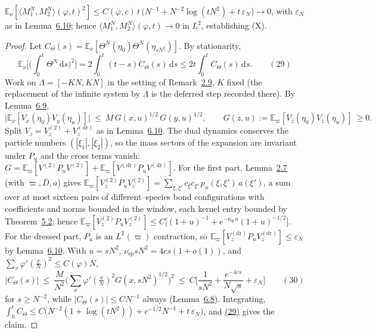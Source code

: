 \documentclass[11pt]{article}
\theoremstyle{plain}
\theoremstyle{definition}
\theoremstyle{remark}
\newcommand{\E}{\mathbb{E}}\newcommand{\PP}{\mathbb{P}}\newcommand{\dd}{\,\mathrm{d}}
\newcommand{\eps}{\varepsilon}\newcommand{\Exp}{\mathrm{Exp}}
\begin{document}
$\E_\nu[\langle M_1^N,M_2^N\rangle(\varphi,t)^2]\le
C(\varphi,c)\,t\,\big(N^{-1}+N^{-2}\log(tN^2)+t\,\eps_N\big)\to0$, with $\eps_N$ as
in Lemma~\hyperref[lem_eps]{6.10}; hence $\langle M_1^N,M_2^N\rangle(\varphi,t)\to0$ in $L^2$,
establishing \textup{(X)}.
\par
\begin{proof}
Let $C_\Theta(s)=\E_\nu[\Theta^N(\eta_0)\Theta^N(\eta_{sN^2})]$. By stationarity,
\label{eq_concstat}
\begin{equation}
  \E_\nu\Big[\Big(\int_0^t\Theta^N\dd s\Big)^2\Big]=2\int_0^t(t-s)C_\Theta(s)\dd s
  \le 2t\int_0^t C_\Theta(s)\dd s.\qquad(29)
\end{equation}
Work on $\Lambda=[-KN,KN]$ in the setting of Remark~\hyperref[rem_orthstatus]{2.9}, $K$ fixed
(the replacement of the infinite system by $\Lambda$ is the deferred step recorded
there). By Lemma~\hyperref[lem_sector]{6.9},
\[
  \big|\E_\nu[V_x(\eta_0)V_y(\eta_u)]\big|\ \le\ M\,G(x,u)^{1/2}\,G(y,u)^{1/2},
  \qquad G(z,u):=\E_\varpi[V_z(\eta_0)V_z(\eta_u)]\ \ge0 .
\]
Split $V_z=V^{(2)}_z+V^{(\mathrm{dr})}_z$ as in Lemma~\hyperref[lem_eps]{6.10}. The dual
dynamics conserves the particle numbers $(|\xi_1|,|\xi_2|)$, so the mass sectors of
the expansion are invariant under $P_u$ and the cross terms vanish:
$G=\E_\varpi[V^{(2)}P_uV^{(2)}]+\E_\varpi[V^{(\mathrm{dr})}P_uV^{(\mathrm{dr})}]$.
For the first part, Lemma~\hyperref[lem_acr]{2.7} (with $\varpi,\bar D,a$) gives
$\E_\varpi[V^{(2)}_zP_uV^{(2)}_z]=\sum_{\xi,\xi'}c_\xi c_{\xi'}\,p_u(\xi,\xi')\,a(\xi')$,
a sum over at most sixteen pairs of different--species bond configurations with
coefficients and norms bounded in the window, each kernel entry bounded by
Theorem~\hyperref[thm_kernel]{5.2}; hence
$\E_\varpi[V^{(2)}_zP_uV^{(2)}_z]\le
C\big[(1+u)^{-1}+e^{-\nu_{\mathrm{sp}}u}(1+u)^{-1/2}\big]$. For the dressed part,
$P_u$ is an $L^2(\varpi)$ contraction, so
$\E_\varpi[V^{(\mathrm{dr})}_zP_uV^{(\mathrm{dr})}_z]\le\eps_N$ by
Lemma~\hyperref[lem_eps]{6.10}. With $u=sN^2$, $\nu_{\mathrm{sp}}sN^2=4cs(1+o(1))$, and
$\sum_x\varphi'(\tfrac xN)^2\le C(\varphi)N$,
\label{eq_Ctheta}
\begin{equation}
  |C_\Theta(s)|\ \le\ \frac{M}{N^2}\Big(\sum_x\varphi'(\tfrac xN)^2G(x,sN^2)^{1/2}\Big)^{\!2}
  \ \le\ C\Big[\frac1{sN^2}+\frac{e^{-4cs}}{N\sqrt s}+\eps_N\Big]\qquad(30)
\end{equation}
for $s\ge N^{-2}$, while $|C_\Theta(s)|\le CN^{-1}$ always (Lemma~\hyperref[lem_eqvar]{6.8}).
Integrating, $\int_0^tC_\Theta\le
C\big(N^{-2}(1+\log(tN^2))+c^{-1/2}N^{-1}+t\,\eps_N\big)$, and \hyperref[eq_concstat]{(29)}
gives the claim.
\end{proof}
\end{document}
